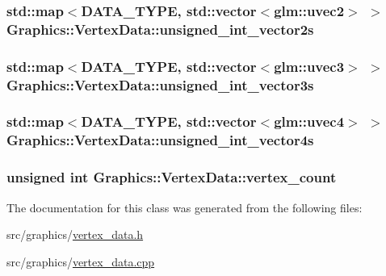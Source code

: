 \subsubsection[{unsigned\+\_\+int\+\_\+vector2s}]{\setlength{\rightskip}{0pt plus 5cm}std\+::map$<${\bf D\+A\+T\+A\+\_\+\+T\+Y\+P\+E}, std\+::vector$<$glm\+::uvec2$>$ $>$ Graphics\+::\+Vertex\+Data\+::unsigned\+\_\+int\+\_\+vector2s\hspace{0.3cm}{\ttfamily [private]}}\label{class_graphics_1_1_vertex_data_a7c1edb826a504590a160d8a6d7ab9ae8}
\hypertarget{class_graphics_1_1_vertex_data_abe783ff7cc5377bef16e9962c64287a9}{}
\subsubsection[{unsigned\+\_\+int\+\_\+vector3s}]{\setlength{\rightskip}{0pt plus 5cm}std\+::map$<${\bf D\+A\+T\+A\+\_\+\+T\+Y\+P\+E}, std\+::vector$<$glm\+::uvec3$>$ $>$ Graphics\+::\+Vertex\+Data\+::unsigned\+\_\+int\+\_\+vector3s\hspace{0.3cm}{\ttfamily [private]}}\label{class_graphics_1_1_vertex_data_abe783ff7cc5377bef16e9962c64287a9}
\hypertarget{class_graphics_1_1_vertex_data_ac2a440c02a321387efa2d0028c151655}{}
\subsubsection[{unsigned\+\_\+int\+\_\+vector4s}]{\setlength{\rightskip}{0pt plus 5cm}std\+::map$<${\bf D\+A\+T\+A\+\_\+\+T\+Y\+P\+E}, std\+::vector$<$glm\+::uvec4$>$ $>$ Graphics\+::\+Vertex\+Data\+::unsigned\+\_\+int\+\_\+vector4s\hspace{0.3cm}{\ttfamily [private]}}\label{class_graphics_1_1_vertex_data_ac2a440c02a321387efa2d0028c151655}
\hypertarget{class_graphics_1_1_vertex_data_a82d5178d37db91235313309418f1ed8e}{}
\subsubsection[{vertex\+\_\+count}]{\setlength{\rightskip}{0pt plus 5cm}unsigned int Graphics\+::\+Vertex\+Data\+::vertex\+\_\+count\hspace{0.3cm}{\ttfamily [private]}}\label{class_graphics_1_1_vertex_data_a82d5178d37db91235313309418f1ed8e}


The documentation for this class was generated from the following files\+:\begin{DoxyCompactItemize}
\item 
src/graphics/\hyperlink{vertex__data_8h}{vertex\+\_\+data.\+h}\item 
src/graphics/\hyperlink{vertex__data_8cpp}{vertex\+\_\+data.\+cpp}\end{DoxyCompactItemize}
